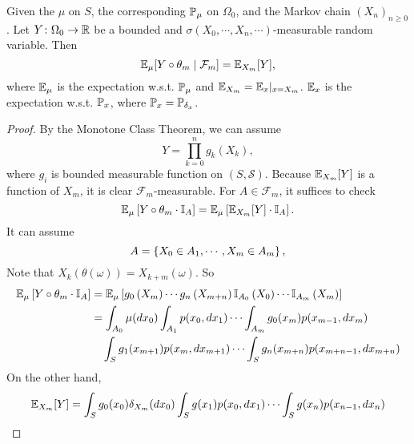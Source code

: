 \begin{thm}
    Given the $\mu$ on $S$, the corresponding $\mathbb{P}_\mu$ on $\Omega_0$, and the Markov chain $(X_n)_{n\geq 0}$. Let $Y \colon \Omega_0 \rightarrow \mathbb{R}$ be a bounded and $\sigma(X_0,\cdots,X_n,\cdots)$-measurable random variable. Then
    \begin{equation*}
        \mathbb{E}_\mu[Y\circ \theta_m \mid \mathcal{F}_m] = \mathbb{E}_{X_m}[Y],
    \end{equation*}
    where $\mathbb{E}_\mu$ is the expectation w.s.t. $\mathbb{P}_\mu$ and $\mathbb{E}_{X_m} = \mathbb{E}_x|_{x = X_m}$. $\mathbb{E}_x$ is the expectation w.s.t. $\mathbb{P}_x$, where $\mathbb{P}_x = \mathbb{P}_{\delta_x}$. 
\end{thm}
\begin{proof}
    By the Monotone Class Theorem, we can assume
    \begin{equation*}
        Y = \prod_{k=0}^n g_k(X_k),
    \end{equation*}
    where $g_i$ is bounded measurable function on $(S,\mathcal{S})$. Because $\mathbb{E}_{X_m}[Y]$ is a function of $X_m$, it is clear $\mathcal{F}_m$-measurable. For $A \in \mathcal{F}_m$, it suffices to check
    \begin{equation*}
        \mathbb{E}_\mu\left[Y\circ \theta_m \cdot \mathbb{I}_A\right] = \mathbb{E}_\mu\left[\mathbb{E}_{X_m}[Y] \cdot \mathbb{I}_A\right].
    \end{equation*}
    It can assume 
    \begin{equation*}
        A = \left\{X_0 \in A_1,\cdots, X_m \in A_m\right\},
    \end{equation*}
    Note that $X_k(\theta(\omega)) = X_{k+m}(\omega)$. So 
    \begin{equation*}
        \begin{aligned}
            \mathbb{E}_\mu\left[Y\circ \theta_m \cdot \mathbb{I}_A\right] &= \mathbb{E}_\mu\left[g_0\left(X_m\right) \cdots g_n\left(X_{m+n}\right) \mathbb{I}_{A_0}\left(X_0\right) \cdots \mathbb{I}_{A_m}\left(X_m\right)\right] \\
            &= \int_{A_0}\mu(dx_0) \int_{A_1}p(x_0,dx_1)\cdots \int_{A_m}g_0(x_m)p(x_{m-1},dx_m) \\
            &\quad \int_S g_1(x_{m+1})p(x_m,dx_{m+1}) \cdots \int_S g_n(x_{m+n}) p(x_{m+n-1},dx_{m+n}) 
        \end{aligned}
    \end{equation*}
    On the other hand,
    \begin{equation*}
        \begin{aligned}
            \E_{X_m}[Y] &= \int_S g_0(x_0) \delta_{X_m}(dx_0)\int_S g(x_1)p(x_0,dx_1) \cdots \int_S g(x_n)p(x_{n-1},dx_n) \\

\end{aligned}
\end{equation*}
\end{proof}
